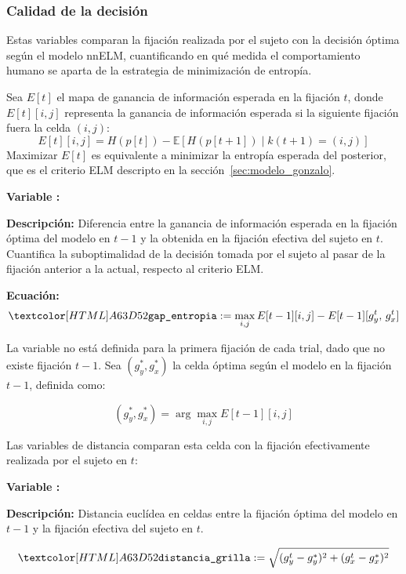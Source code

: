 \subsubsection{Calidad de la decisión}

Estas variables comparan la fijación realizada por el sujeto con la
decisión óptima según el modelo nnELM, cuantificando en qué medida
el comportamiento humano se aparta de la estrategia de minimización
de entropía.

Sea $E[t]$ el mapa de ganancia de información esperada en la
fijación $t$, donde $E[t][i,j]$ representa la ganancia de
información esperada si la siguiente fijación fuera la celda
$(i,j)$:
\begin{equation}
    E[t][i,j] = H(p[t]) - \mathbb{E}[H(p[t+1]) \mid k(t+1) = (i,j)]
\end{equation}
Maximizar $E[t]$ es equivalente a minimizar la entropía esperada del
posterior, que es el criterio ELM descripto en la
sección~\ref{sec:modelo_gonzalo}.

\begin{featuredef}
\textbf{Variable \thetcbcounter:} 

\textbf{Descripción:} Diferencia entre la ganancia de información esperada
en la fijación óptima del modelo en $t-1$ y la obtenida en la fijación
efectiva del sujeto en $t$. Cuantifica la suboptimalidad de la decisión
tomada por el sujeto al pasar de la fijación anterior a la actual,
respecto al criterio ELM.

\textbf{Ecuación:}
\begin{equation}
    \feat{gap\_entropia} := \max_{i,j} E[t-1][i,j] -
    E[t-1][g_y^{t},\, g_x^{t}]
\end{equation}
\end{featuredef}
La variable  no está definida para la primera
fijación de cada trial, dado que no existe fijación $t-1$.
Sea $(g_y^*, g_x^*)$ la celda óptima según el modelo en la fijación
$t-1$, definida como:

\begin{equation}
    (g_y^*, g_x^*) = \arg\max_{i,j} E[t-1][i,j]
\end{equation}

Las variables de distancia comparan esta celda con la fijación
efectivamente realizada por el sujeto en $t$:

\begin{featuredef}
\textbf{Variable \thetcbcounter:} 

\textbf{Descripción:} Distancia euclídea en celdas entre la fijación
óptima del modelo en $t-1$ y la fijación efectiva del sujeto en $t$.

\begin{equation}
    \feat{distancia\_grilla} := \sqrt{(g_y^{t} - g_y^*)^2 +
    (g_x^{t} - g_x^*)^2}
\end{equation}
\end{featuredef}

